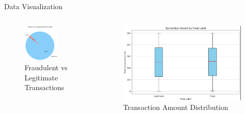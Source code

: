 \documentclass{beamer}
\begin{document}
\begin{frame}{Data Visualization}
    \begin{columns} %
        \begin{column}{0.5\textwidth}
            \begin{figure}
                \centering
                \includegraphics[width=0.7\textwidth]{images/fraudvsleg.png} %
                \caption{Fraudulent vs Legitimate Transactions}
            \end{figure}
        \end{column}
        
        \begin{column}{0.5\textwidth}
            \begin{figure}
                \centering
                \includegraphics[width=1\textwidth]{images/amt.png} %
                \caption{Transaction Amount Distribution}
            \end{figure}
        \end{column}
    \end{columns}
\end{frame}
\end{document}

